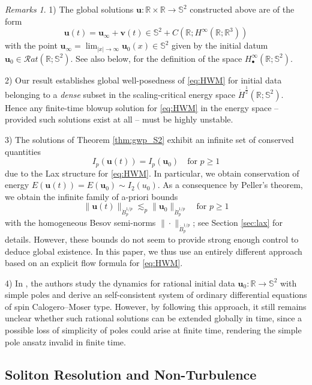 \documentclass[11pt,reqno]{amsart}
\theoremstyle{definition}
\theoremstyle{remark}
\theoremstyle{remark}
\newtheorem*{remarks*}{Remarks}
\numberwithin{equation}{section}
\newcommand{\R}{\mathbb{R}}
\newcommand{\Ss}{\mathbb{S}}
\newcommand{\uu}{\mathbf{u}}
\begin{document}
\begin{remarks*} 
1) The global solutions $\uu : \R \times \R \to \Ss^2$ constructed above are of the form
$$
\uu(t) = \uu_\infty + \mathbf{v}(t) \in \Ss^2 + C(\R; H^\infty(\R; \R^3))
$$
with the point $\uu_\infty = \lim_{|x| \to \infty} \uu_0(x) \in \Ss^2$ given by the initial datum $\uu_0 \in \mathcal{R}at(\R; \Ss^2)$. See also below, for the definition of the space $H^\infty_\bullet(\R; \Ss^2)$. 

2) Our result establishes global well-posedness of \eqref{eq:HWM} for initial data belonging to a {\em dense} subset in the scaling-critical energy space $\dot{H}^{\frac 1 2}(\R; \Ss^2)$. Hence any finite-time blowup solution for \eqref{eq:HWM} in the energy space -- provided such solutions exist at all -- must be highly unstable.

3) The  solutions of Theorem \ref{thm:gwp_S2} exhibit an infinite set of conserved quantities 
$$
I_{p}(\uu(t)) = I_{p}(\uu_0) \quad \mbox{for $p \geq 1$}
$$ 
due to the Lax structure for \eqref{eq:HWM}. In particular, we obtain conservation of energy $E(\uu(t)) = E(\uu_0) \sim I_2(u_0)$. As a consequence by Peller's theorem, we obtain the infinite family of a-priori bounds
$$
\| \uu(t) \|_{\dot{B}^{1/p}_p} \lesssim_p \| \uu_0 \|_{\dot{B}^{1/p}_p} \quad \mbox{for $p \geq 1$}
$$
with the homogeneous Besov semi-norms $\| \cdot \|_{\dot{B}^{1/p}_p}$; see Section \ref{sec:lax} for details. However, these bounds do not seem to provide strong enough control to deduce global existence. In this paper, we thus use an entirely different approach based on an explicit flow formula for \eqref{eq:HWM}. 

4) In \cite{BeKlLa-20}, the authors study the dynamics for rational initial data $\uu_0 : \R \to \Ss^2$ with simple poles and derive an self-consistent system of ordinary differential equations of spin Calogero--Moser type. However, by following this approach, it still remains unclear whether such rational solutions can be extended globally in time, since a possible loss of simplicity of poles could arise at finite time, rendering the simple pole ansatz invalid in finite time.   
\end{remarks*}

\subsection*{Soliton Resolution and Non-Turbulence}
\end{document}
